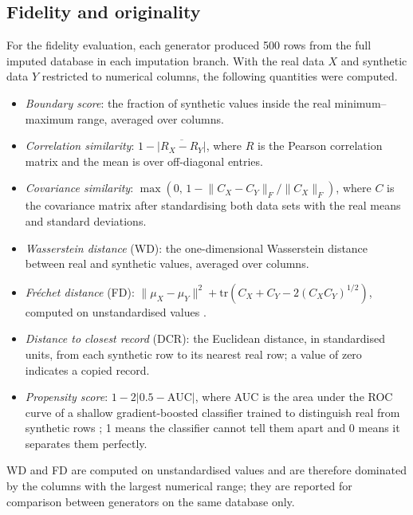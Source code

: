\documentclass[pdflatex,sn-basic]{sn-jnl}
\begin{document}
\subsection{Fidelity and originality}\label{sec:metrics}
For the fidelity evaluation, each generator produced 500 rows from the full imputed database in each imputation
branch. With the real data $X$ and synthetic data $Y$ restricted to numerical columns, the following quantities
were computed.
\begin{itemize}
\item \emph{Boundary score}: the fraction of synthetic values inside the real minimum--maximum range, averaged
over columns.
\item \emph{Correlation similarity}: $1 - \overline{|R_X - R_Y|}$, where $R$ is the Pearson correlation matrix and
the mean is over off-diagonal entries.
\item \emph{Covariance similarity}: $\max\left(0,\, 1 - \lVert C_X - C_Y \rVert_F / \lVert C_X \rVert_F\right)$,
where $C$ is the covariance matrix after standardising both data sets with the real means and standard
deviations.
\item \emph{Wasserstein distance} (WD): the one-dimensional Wasserstein distance between real and synthetic
values, averaged over columns.
\item \emph{Fr\'echet distance} (FD): $\lVert \mu_X - \mu_Y \rVert^2 + \mathrm{tr}\left(C_X + C_Y -
2(C_X C_Y)^{1/2}\right)$, computed on unstandardised values \citep{heusel2017fid}.
\item \emph{Distance to closest record} (DCR): the Euclidean distance, in standardised units, from each synthetic
row to its nearest real row; a value of zero indicates a copied record.
\item \emph{Propensity score}: $1 - 2|0.5 - \mathrm{AUC}|$, where AUC is the area under the ROC curve of a
shallow gradient-boosted classifier trained to distinguish real from synthetic rows
\citep{snoke2018utility}; 1 means the classifier cannot tell them apart and 0 means it separates them perfectly.
\end{itemize}
WD and FD are computed on unstandardised values and are therefore dominated by the columns with the largest
numerical range; they are reported for comparison between generators on the same database only.
\end{document}
